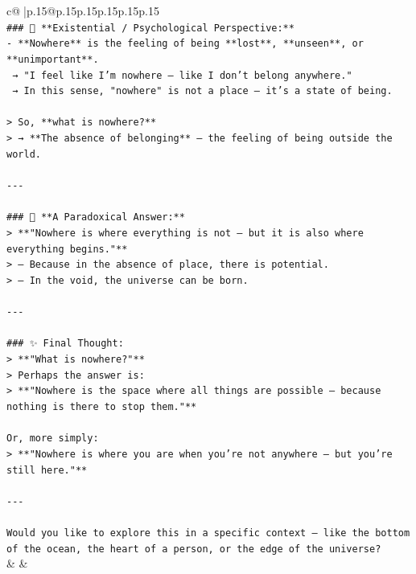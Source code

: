 \documentclass{article}
\begin{document}
{\begin{supertabular}{c@{$\;$}|p{.15\linewidth}@{}p{.15\linewidth}p{.15\linewidth}p{.15\linewidth}p{.15\linewidth}p{.15\linewidth}}
{{{\\ 
\texttt{\#\#\# 🤔 **Existential / Psychological Perspective:**} \\
\texttt{{-} **Nowhere** is the feeling of being **lost**, **unseen**, or **unimportant**.  } \\
\texttt{  → "I feel like I’m nowhere — like I don’t belong anywhere."  } \\
\texttt{  → In this sense, "nowhere" is not a place — it’s a state of being.} \\
\\ 
\texttt{> So, **what is nowhere?**  } \\
\texttt{> → **The absence of belonging** — the feeling of being outside the world.} \\
\\ 
\texttt{{-}{-}{-}} \\
\\ 
\texttt{\#\#\# 🧩 **A Paradoxical Answer:**} \\
\texttt{> **"Nowhere is where everything is not — but it is also where everything begins."**  } \\
\texttt{> — Because in the absence of place, there is potential.  } \\
\texttt{> — In the void, the universe can be born.} \\
\\ 
\texttt{{-}{-}{-}} \\
\\ 
\texttt{\#\#\# ✨ Final Thought:} \\
\texttt{> **"What is nowhere?"**  } \\
\texttt{> Perhaps the answer is:  } \\
\texttt{> **"Nowhere is the space where all things are possible — because nothing is there to stop them."**} \\
\\ 
\texttt{Or, more simply:  } \\
\texttt{> **"Nowhere is where you are when you’re not anywhere — but you’re still here."**} \\
\\ 
\texttt{{-}{-}{-}} \\
\\ 
\texttt{Would you like to explore this in a specific context — like the bottom of the ocean, the heart of a person, or the edge of the universe?} \\
            }
        }
    }
    & & \\ \\


\end{supertabular}}
\end{document}

